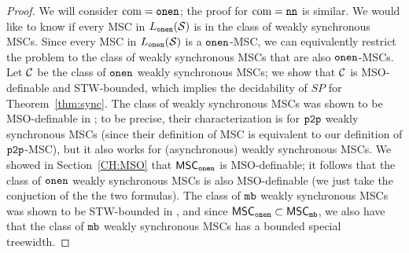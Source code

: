 \begin{proof}

	We will consider $\textup{com} = \mathtt{onen}$; the proof for $\textup{com} = \mathtt{nn}$ is similar. We would like to know if every MSC in $L_{\mathtt{onen}}(\mathcal{S})$ is in the class of weakly synchronous MSCs. Since every MSC in $L_{\mathtt{onen}}(\mathcal{S})$ is a $\mathtt{onen}$-MSC, we can equivalently restrict the problem to the class of weakly synchronous MSCs that are also $\mathtt{onen}$-MSCs. Let $\mathcal{C}$ be the class of $\mathtt{onen}$ weakly synchronous MSCs; we show that $\mathcal{C}$ is MSO-definable and STW-bounded, which implies the decidability of $SP$ for Theorem~\ref{thm:sync}. The class of weakly synchronous MSCs was shown to be MSO-definable in \cite{BolligGFLLS21}; to be precise, their characterization is for $\mathtt{p2p}$ weakly synchronous MSCs (since their definition of MSC is equivalent to our definition of $\mathtt{p2p}$-MSC), but it also works for (asynchronous) weakly synchronous MSCs. We showed in Section~\ref{CH:MSO} that $\mathsf{MSC}_{\mathtt{onen}}$ is MSO-definable; it follows that the class of $\mathtt{onen}$ weakly synchronous MSCs is also MSO-definable (we just take the conjuction of the the two formulas). The class of $\mathtt{mb}$ weakly synchronous MSCs was shown to be STW-bounded in \cite{BolligGFLLS21}, and since $\mathsf{MSC}_{\mathtt{onen}} \subset \mathsf{MSC}_{\mathtt{mb}}$, we also have that the class of $\mathtt{mb}$ weakly synchronous MSCs has a bounded special treewidth. 
\end{proof}

